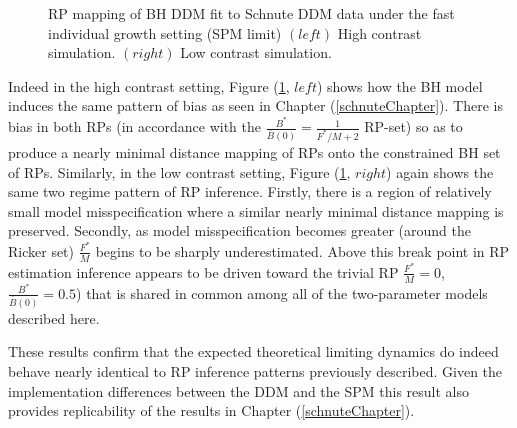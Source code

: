 \begin{figure}[h!]
\begin{minipage}[h!]{0.09\textwidth}
\end{minipage}
\caption{
RP mapping of BH DDM fit to Schnute DDM data under the fast individual growth setting (SPM limit)
$(left)$ High contrast simulation.
$(right)$ Low contrast simulation.
}\label{prodLimit}
\end{figure}


Indeed in the high contrast setting, Figure (\ref{prodLimit}, $left$) shows
how the BH model induces the same pattern of bias as seen in Chapter
(\ref{schnuteChapter}). There is bias in both RPs (in accordance with the
$\frac{B^*}{\bar B(0)}=\frac{1}{F^*/M+2}$ RP-set) so as to produce a nearly
minimal distance mapping of RPs onto the constrained BH set of RPs.
Similarly, in the low contrast setting, Figure (\ref{prodLimit}, $right$) again
shows the same two regime pattern of RP inference. Firstly, there is a region of
relatively small model misspecification where a similar nearly minimal distance mapping
is preserved. Secondly, as model misspecification becomes greater (around the
Ricker set) $\frac{F^*}{M}$ begins to be sharply underestimated. Above this
break point in RP estimation inference appears to be driven toward the trivial RP
$\frac{F^*}{M}=0$, $\frac{B^*}{\bar B(0)}=0.5$) that is shared in common
among all of the two-parameter models described here.

%
These results confirm that the expected theoretical limiting dynamics do indeed behave 
nearly identical to RP inference patterns previously described. Given the implementation 
differences between the DDM and the SPM this result also provides replicability %
of the results in Chapter (\ref{schnuteChapter}). 

